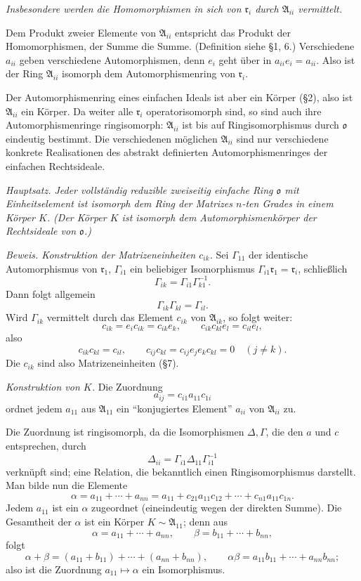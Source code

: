 \documentclass[11pt]{article}
\providecommand{\mA}{\mathfrak{A}}
\providecommand{\mo}{\mathfrak{o}}
\providecommand{\mr}{\mathfrak{r}}
\begin{document}
\emph{Insbesondere werden die Homomorphismen in sich von $\mr_i$ durch $\mA_{ii}$ vermittelt.}

Dem Produkt zweier Elemente von $\mA_{ii}$ entspricht das Produkt der Homomorphismen, der Summe die Summe. (Definition siehe §1, 6.) Verschiedene $a_{ii}$ geben verschiedene Automorphismen, denn $e_i$ geht über in $a_{ii}e_i=a_{ii}$. Also ist der Ring $\mA_{ii}$ isomorph dem Automorphismenring von $\mr_i$.

Der Automorphismenring eines einfachen Ideals ist aber ein Körper (§2), also ist $\mA_{ii}$ ein Körper. Da weiter alle $\mr_i$ operatorisomorph sind, so sind auch ihre Automorphismenringe ringisomorph: $\mA_{ii}$ ist bis auf Ringisomorphismus durch $\mo$ eindeutig bestimmt. Die verschiedenen möglichen $\mA_{ii}$ sind nur verschiedene konkrete Realisationen des abstrakt definierten Automorphismenringes der einfachen Rechtsideale.

\emph{Hauptsatz. Jeder vollständig reduzible zweiseitig einfache Ring $\mo$ mit Einheitselement ist isomorph dem Ring der Matrizes $n$-ten Grades in einem Körper $K$. (Der Körper $K$ ist isomorph dem Automorphismenkörper der Rechtsideale von $\mo$.)}

\emph{Beweis. Konstruktion der Matrizeneinheiten $c_{ik}$.} Sei $\Gamma_{11}$ der identische Automorphismus von $\mr_1$, $\Gamma_{i1}$ ein beliebiger Isomorphismus $\Gamma_{i1}\mr_1=\mr_i$, schließlich
\[
        \Gamma_{ik}=\Gamma_{i1}\Gamma_{k1}^{-1}.
\]
Dann folgt allgemein
\[
        \Gamma_{ik}\Gamma_{kl}=\Gamma_{il}.
\]
Wird $\Gamma_{ik}$ vermittelt durch das Element $c_{ik}$ von $\mA_{ik}$, so folgt weiter:
\[
        c_{ik}=e_i c_{ik}=c_{ik}e_k,
        \qquad
        c_{ik}c_{kl}e_l=c_{il}e_l,
\]
also
\[
        c_{ik}c_{kl}=c_{il},
        \qquad
        c_{ij}c_{kl}=c_{ij}e_j e_k c_{kl}=0\quad(j\ne k).
\]
Die $c_{ik}$ sind also Matrizeneinheiten (§7).


\emph{Konstruktion von $K$.} Die Zuordnung
\[
        a_{ij}=c_{i1}a_{11}c_{1i}
\]
ordnet jedem $a_{11}$ aus $\mA_{11}$ ein ``konjugiertes Element'' $a_{ii}$ von $\mA_{ii}$ zu.

Die Zuordnung ist ringisomorph, da die Isomorphismen $\Delta,\Gamma$, die den $a$ und $c$ entsprechen, durch
\[
        \Delta_{ii}=\Gamma_{i1}\Delta_{11}\Gamma_{i1}^{-1}
\]
verknüpft sind; eine Relation, die bekanntlich einen Ringisomorphismus darstellt. Man bilde nun die Elemente
\[
        \alpha=a_{11}+\cdots+a_{nn}=a_{11}+c_{21}a_{11}c_{12}+\cdots+c_{n1}a_{11}c_{1n}.
\]
Jedem $a_{11}$ ist ein $\alpha$ zugeordnet (eineindeutig wegen der direkten Summe). Die Gesamtheit der $\alpha$ ist ein Körper $K\sim\mA_{11}$; denn aus
\[
        \alpha=a_{11}+\cdots+a_{nn},
        \qquad
        \beta=b_{11}+\cdots+b_{nn},
\]
folgt
\[
        \alpha+\beta=(a_{11}+b_{11})+\cdots+(a_{nn}+b_{nn}),
        \qquad
        \alpha\beta=a_{11}b_{11}+\cdots+a_{nn}b_{nn};
\]
also ist die Zuordnung $a_{11}\mapsto\alpha$ ein Isomorphismus.
\end{document}
